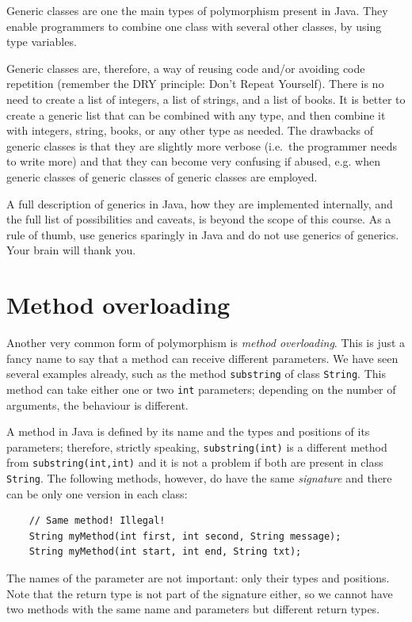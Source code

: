 Generic classes are one the main types of polymorphism present in
Java. They enable programmers to combine one class with several other
classes, by using type variables. 

Generic classes are, therefore, a way of reusing code and/or avoiding
code repetition (remember the DRY principle: Don't Repeat Yourself). 
There is no need to create a list of integers, a list of
strings, and a list of books. It is better to create a generic list
that can be combined with any type, and then combine it with integers,
string, books, or any other type as needed. The drawbacks of generic
classes is that they are slightly more verbose (i.e.~the programmer
needs to write more) and that they can become very confusing if
abused, e.g. when generic classes of generic classes of generic
classes are employed. 

A full description of generics in Java, how they are implemented
internally, and the full list of possibilities and caveats, is beyond
the scope of this course. As a rule of thumb, use generics sparingly in
Java and do not use generics of generics. Your brain will thank you. 


\section{Method overloading}
\label{sec:method-overloading}

Another very common form of polymorphism is \emph{method
  overloading}. This is just a fancy name to say that a method can
receive different parameters. We have seen several examples already,
such as the method \verb+substring+ of class \verb+String+. This
method can take either one or two \verb+int+ parameters; depending on
the number of arguments, the behaviour is different. 

A method in Java is defined by its name and the types and positions of
its parameters; therefore, strictly speaking, \verb+substring(int)+ is
a different method from \verb+substring(int,int)+ and it is not a
problem if both are present in class \verb+String+. The following
methods, however, do have the same \emph{signature} and there can be
only one version in each class: 

\begin{verbatim}
    // Same method! Illegal!
    String myMethod(int first, int second, String message);
    String myMethod(int start, int end, String txt);
\end{verbatim}

The names of the parameter are not important: only their types and
positions. Note that the return type is not part of the signature
either, so we cannot have two methods with the same name and
parameters but different return types. 

